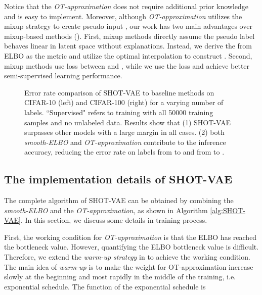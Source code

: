 \documentclass[letterpaper]{article}
\begin{document}
Notice that the \textit{OT-approximation} does not require additional prior knowledge and is easy to implement. Moreover, although \textit{OT-approximation} utilizes the mixup strategy to create pseudo input , our work has two main advantages over mixup-based methods (\citealt{DBLP:conf/iclr/ZhangCDL18,DBLP:conf/icml/VermaLBNMLB19}). First, mixup methods directly assume the pseudo label  behaves linear in latent space without explanations. Instead, we derive the  from ELBO as the metric and utilize the optimal interpolation  to construct . Second, mixup methods use  loss between  and , while we use the  loss and achieve better semi-supervised learning performance.
\begin{figure*}[t]
\centering
{}   
\vspace{-0.2in}
\caption{Error rate comparison of SHOT-VAE to baseline methods on CIFAR-10 (left) and CIFAR-100 (right) for a varying number of labels. ``Supervised" refers to training with all 50000 training samples and no unlabeled data. Results show that (1) SHOT-VAE surpasses other models with a large margin in all cases. (2) both \textit{smooth-ELBO} and \textit{OT-approximation} contribute to the inference accuracy, reducing the error rate on  labels from  to  and from  to .}
\label{fig:vary-ratios-label}
\end{figure*}
\subsection{The implementation details of SHOT-VAE}
The complete algorithm of SHOT-VAE can be obtained by combining the \textit{smooth-ELBO} and the \textit{OT-approximation}, as shown in Algorithm \ref{alg:SHOT-VAE}. In this section, we discuss some details in training process.

First, the working condition for \textit{OT-approximation} is that the ELBO has reached the bottleneck value. However, quantifying the ELBO bottleneck value is difficult. Therefore, we extend the \textit{\textit{warm-up strategy}} in  \citep{DBLP:conf/iclr/HigginsMPBGBML17} to achieve the working condition. The main idea of \textit{\textit{warm-up}} is to make the weight  for OT-approximation increase slowly at the beginning and most rapidly in the middle of the training, i.e. exponential schedule. The function of the exponential schedule is
\end{document}
